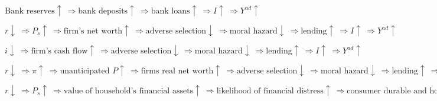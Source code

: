 \documentclass[12pt]{examnotes}
\begin{document}
$\text{Bank reserves} \uparrow \ \Rightarrow \text{bank deposits}  \uparrow \ \Rightarrow \text{bank loans} \uparrow \ \Rightarrow  I \uparrow \ \Rightarrow Y^{ad} \uparrow$ 

\vspace{6pt}
\ra 

$r \downarrow \ \Rightarrow P_s \uparrow \ \Rightarrow \text{firm's net worth} \uparrow \ \Rightarrow \text{adverse selection} \downarrow \ \Rightarrow \text{moral hazard} \downarrow \ \Rightarrow \text{lending} \uparrow \ \Rightarrow  I \uparrow \ \Rightarrow Y^{ad} \uparrow$ 


\vspace{6pt}

$i \downarrow \ \Rightarrow \text{firm's cash flow} \uparrow \ \Rightarrow  \text{adverse selection} \downarrow \ \Rightarrow \text{moral hazard} \downarrow \ \Rightarrow \text{lending} \uparrow \ \Rightarrow  I \uparrow \ \Rightarrow Y^{ad} \uparrow$ 


\vspace{6pt}

{\scriptsize $r \downarrow \ \Rightarrow \pi \uparrow \ \Rightarrow  \text{unanticipated }P \uparrow \ \Rightarrow \text{firms real net worth} \uparrow \ \Rightarrow \text{adverse selection} \downarrow \ \Rightarrow \text{moral hazard} \downarrow \ \Rightarrow \text{lending} \uparrow \ \Rightarrow  I \uparrow \ \Rightarrow Y^{ad} \uparrow$ }


\vspace{6pt}

{\scriptsize $r \downarrow \ \Rightarrow P_s \uparrow \ \Rightarrow  \text{value of household's financial assets} \uparrow \ \Rightarrow \text{likelihood of financial distress} \uparrow \ \Rightarrow \text{consumer durable and housing expenditure} \uparrow \ \Rightarrow Y^{ad} \uparrow$ }







\end{document}
